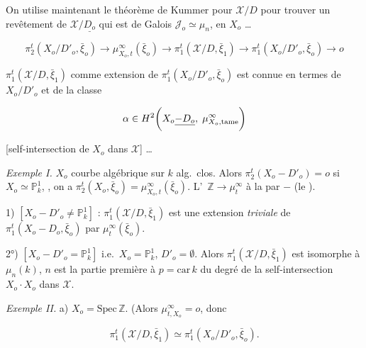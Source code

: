 \documentclass[11pt,a4paper]{article}
\begin{document}
On utilise maintenant le théorème de Kummer pour $\mathcal{X}/D$ pour trouver un
revêtement de $\mathcal{X}/\underline{D_{o}}$ qui est  \ill{}  de
Galois $\mathcal{J}_{o} \simeq \mu_{n}$,  \ill{}  en $X_{o}$ \ldots

\[ \pi_{2}^{t}(X_{o}/D'_{o}, \bar{\xi}_{o}) \to
\mu^{\infty}_{X_{o}, t}(\bar{\xi}_{o}) \to \pi_{1}^{t}(\mathcal{X}/D,
\bar{\xi}_{1}) \to \pi_{1}^{t}(X_{o}/D'_{o}, \bar{\xi}_{o}) \to o \]

$\pi_{1}^{t}(\mathcal{X}/D, \bar{\xi}_{1})$ comme extension de
$\pi_{1}^{t}(X_{o}/D'_{o}, \bar{\xi}_{o})$ est connue  en
termes de $X_{o}/D'_{o}$ et de la classe

\[ \alpha \in H^{2}\!\left(X_{o} \struck{- D_{o}},\;
\mu^{\infty}_{X_{o}, \mathrm{tame}}\right) \]

[self-intersection de $X_{o}$ dans $\mathcal{X}$] \ldots

\emph{Exemple I.} $X_{o}$ courbe algébrique  sur $k$ alg.\ clos. Alors
$\pi_{2}^{t}(X_{o} - D'_{o}) = o$  si $X_{o} \simeq \mathbb{P}^{1}_{k}$,
 \ill{} \ill{}, on a $\pi_{2}^{t}(X_{o}, \bar{\xi}_{o}) =
\mu^{\infty}_{X_{o}, t}(\bar{\xi}_{o})$. L'\ $\mathbb{Z} \to \mu^{\infty}_{t}$
\ill{} \ill{}  \ill{} à la  par $-$ (le ). \struck{\ill{}}

1) $\left[X_{o} - D'_{o} \neq \mathbb{P}^{1}_{k}\right]$ \struck{\ill{}} :
$\pi_{1}^{t}(\mathcal{X}/D, \bar{\xi}_{1})$ est une extension \emph{triviale} de
$\pi_{1}^{t}(X_{o} - D_{o}, \bar{\xi}_{o})$ par
$\mu^{\infty}_{t}(\bar{\xi}_{o})$.


2°) $\left[X_{o} - D'_{o} = \mathbb{P}^{1}_{k}\right]$ i.e.\ $X_{o} =
\mathbb{P}^{1}_{k}$, $D'_{o} = \emptyset$. Alors
$\pi_{1}^{t}(\mathcal{X}/D, \bar{\xi}_{1})$ est  isomorphe
à $\mu_{n}(k)$,  $n$ est la partie première à $p = \mathrm{car}\, k$
du degré de la self-intersection $X_{o} \cdot X_{o}$ dans
$\mathcal{X}$.


\emph{Exemple II.} a) $X_{o} = \mathrm{Spec}\, \mathbb{Z}$. (Alors
$\mu^{\infty}_{t, X_{o}} = o$, donc

\[ \pi_{1}^{t}(\mathcal{X}/D, \bar{\xi}_{1}) \simeq \pi_{1}^{t}(X_{o}/D'_{o},
\bar{\xi}_{o}). \]
\end{document}
